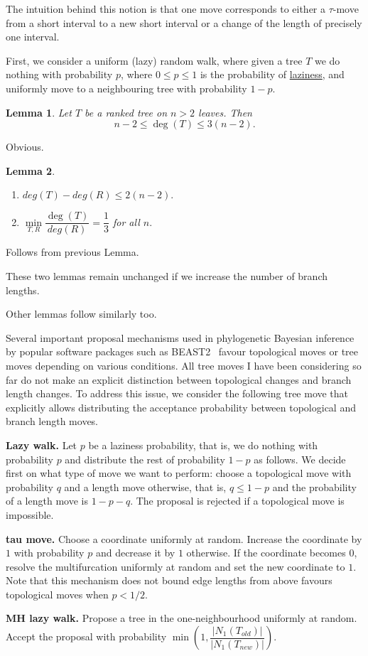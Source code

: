\documentclass{amsart}
\newtheorem{lemma}{Lemma}
\begin{document}
The intuition behind this notion is that one move corresponds to either 
a $\tau$-move from a short interval to a new short interval or a change 
of the length of precisely one interval. 

First, we consider a uniform (lazy) random walk, where given a tree $T$ 
we do nothing with probability $p$, where $0\leq p\leq 1$ is the probability of 
\href{https://academichelp.net/wp-content/uploads/2014/01/laziness.jpg}{laziness},
and uniformly move to a neighbouring tree with probability $1-p$. 

\begin{lemma}
Let $T$ be a ranked tree on $n>2$ leaves. Then \[n-2\leq \deg(T)\leq3(n-2).\] 
\end{lemma}

\proof
Obvious.
\endproof

\begin{lemma}
\begin{enumerate}[(1)]
\item $deg(T)-deg(R) \leq 2(n-2).$
\item $\min\limits_{T,R}\dfrac{\deg(T)}{deg(R)} = \dfrac13$ for all $n.$
\end{enumerate}
\end{lemma}

\proof
Follows from previous Lemma. 
\endproof

These two lemmas remain unchanged if we increase the number of branch lengths. 

Other lemmas follow similarly too. 

Several important proposal mechanisms used in phylogenetic Bayesian inference by 
popular software packages such as BEAST2~\cite{beast2} favour topological moves
or tree moves depending on various conditions. All tree moves I have been 
considering so far do not make an explicit distinction between topological 
changes and branch length changes. To address this issue, we consider the
following tree move that explicitly allows distributing the acceptance 
probability between topological and branch length moves. 

{\bf Lazy walk.} Let $p$ be a laziness probability, that is, we do nothing 
with probability $p$ and distribute the rest of probability $1-p$ as follows. 
We decide first on what type of move we want to perform: choose a topological 
move with probability $q$ and a length move otherwise, that is, $q \leq 1-p$
and the probability of a length move is $1-p-q$. The proposal is rejected if
a topological move is impossible. 

{\bf tau move.} Choose a coordinate uniformly at random. Increase the
coordinate by $1$ with probability $p$ and decrease it by $1$ otherwise.
If the coordinate becomes $0$, resolve the multifurcation uniformly at
random and set the new coordinate to $1$. Note that this mechanism 
does not bound edge lengths from above favours topological moves when 
$p<1/2$. 

{\bf MH lazy walk.} Propose a tree in the one-neighbourhood uniformly at random. 
Accept the proposal with probability 
$\min(1, \dfrac{|N_1(T_{old})|}{|N_1(T_{new})|})$. 



\end{document}
